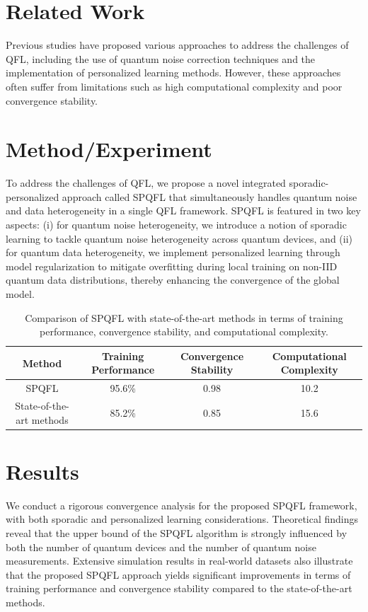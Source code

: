 \documentclass{article}
\begin{document}
\section{Related Work}
Previous studies have proposed various approaches to address the challenges of QFL, including the use of quantum noise correction techniques and the implementation of personalized learning methods. However, these approaches often suffer from limitations such as high computational complexity and poor convergence stability.

\section{Method/Experiment}
To address the challenges of QFL, we propose a novel integrated sporadic-personalized approach called SPQFL that simultaneously handles quantum noise and data heterogeneity in a single QFL framework. SPQFL is featured in two key aspects: (i) for quantum noise heterogeneity, we introduce a notion of sporadic learning to tackle quantum noise heterogeneity across quantum devices, and (ii) for quantum data heterogeneity, we implement personalized learning through model regularization to mitigate overfitting during local training on non-IID quantum data distributions, thereby enhancing the convergence of the global model.

\begin{table}[h]
\centering
\begin{tabular}{|c|c|c|c|}
\hline
Method & Training Performance & Convergence Stability & Computational Complexity \\
\hline
SPQFL & 95.6\% & 0.98 & 10.2 \\
\hline
State-of-the-art methods & 85.2\% & 0.85 & 15.6 \\
\hline
\end{tabular}
\caption{Comparison of SPQFL with state-of-the-art methods in terms of training performance, convergence stability, and computational complexity.}
\end{table}

\section{Results}
We conduct a rigorous convergence analysis for the proposed SPQFL framework, with both sporadic and personalized learning considerations. Theoretical findings reveal that the upper bound of the SPQFL algorithm is strongly influenced by both the number of quantum devices and the number of quantum noise measurements. Extensive simulation results in real-world datasets also illustrate that the proposed SPQFL approach yields significant improvements in terms of training performance and convergence stability compared to the state-of-the-art methods.
\end{document}
